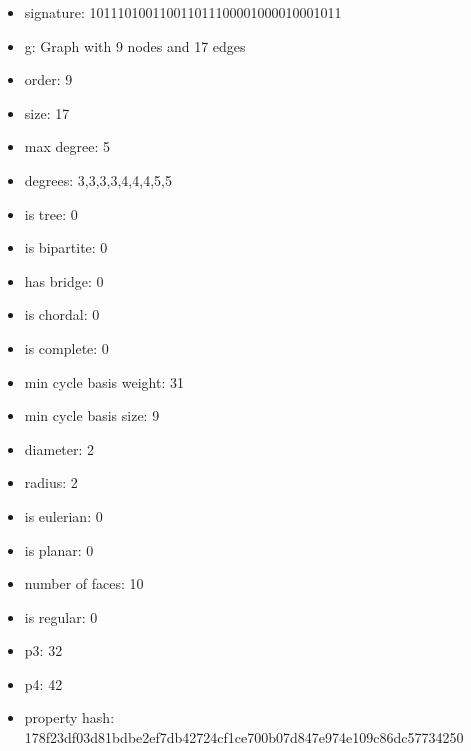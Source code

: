 \newpage
\begin{figure}
\end{figure}
\begin{itemize}
\item signature: 101110100110011011100001000010001011
\item g: Graph with 9 nodes and 17 edges
\item order: 9
\item size: 17
\item max degree: 5
\item degrees: 3,3,3,3,4,4,4,5,5
\item is tree: 0
\item is bipartite: 0
\item has bridge: 0
\item is chordal: 0
\item is complete: 0
\item min cycle basis weight: 31
\item min cycle basis size: 9
\item diameter: 2
\item radius: 2
\item is eulerian: 0
\item is planar: 0
\item number of faces: 10
\item is regular: 0
\item p3: 32
\item p4: 42
\item property hash: 178f23df03d81bdbe2ef7db42724cf1ce700b07d847e974e109c86dc57734250
\end{itemize}

